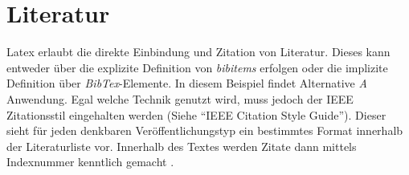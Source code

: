 \section{Literatur}
Latex erlaubt die direkte Einbindung und Zitation von Literatur. Dieses kann entweder über die explizite Definition von \textit{bibitems} erfolgen oder die implizite Definition über \textit{BibTex}-Elemente. In diesem Beispiel findet Alternative \textit{A} Anwendung. Egal welche Technik genutzt wird, muss jedoch der IEEE Zitationsstil eingehalten werden (Siehe ``IEEE Citation Style Guide''). Dieser sieht für jeden denkbaren Veröffentlichungstyp ein bestimmtes Format innerhalb der Literaturliste vor. Innerhalb des Textes werden Zitate dann mittels Indexnummer kenntlich gemacht \cite{zhang1999}.




